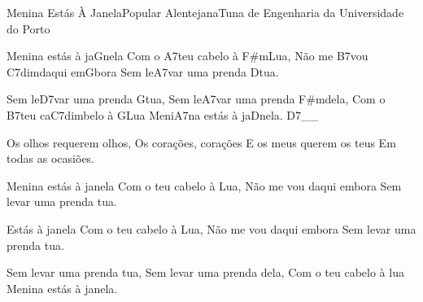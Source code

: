 \begin{musica}{Menina Estás À Janela}{Popular Alentejana}{Tuna de Engenharia da Universidade do Porto}
\nota{\phantom{Introdução: }[G/F#m/Em A7/D/D7]}

Menina estás à ja\ac{G}{ne}la
Com o \ac{A7}{teu} cabelo à \ac{F#m}{Lua},
Não me \ac{B7}{vou} \ac{C7dim}{da}qui em\ac{G}{bo}ra
Sem le\ac{A7}{var} uma prenda \ac{D}{tua}.

Sem le\ac{D7}{var} uma prenda \ac{G}{tua},
Sem le\ac{A7}{var} uma prenda \ac{F#m}{de}la,
Com o \ac{B7}{teu} ca\ac{C7dim}{be}lo à \ac{G}{Lua}
Meni\ac{A7}{na} estás à ja\ac{D}{ne}la. \ac{D7}{}__


Os olhos requerem olhos,
Os corações, corações
E os meus querem os teus
Em todas as ocasiões.

Menina estás à janela
Com o teu cabelo à Lua,
Não me vou daqui embora
Sem levar uma prenda tua.



Estás à janela
Com o teu cabelo à Lua,
Não me vou daqui embora
Sem levar uma prenda tua.

Sem levar uma prenda tua,
Sem levar uma prenda dela,
Com o teu cabelo à lua
Menina estás à janela.

\end{musica}
